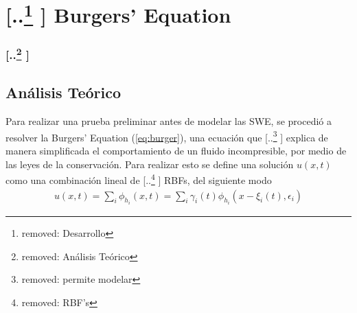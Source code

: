 \documentclass[spanish]{article} %
\providecommand{\DIFaddtex}[1]{{\protect\color{blue} \sf #1}} %
\providecommand{\DIFdeltex}[1]{{\protect\color{red} [..\footnote{removed: #1} ]}} %
\providecommand{\DIFaddbegin}{} %
\providecommand{\DIFaddend}{} %
\providecommand{\DIFdelbegin}{} %
\providecommand{\DIFdelend}{} %
\providecommand{\DIFadd}[1]{\texorpdfstring{\DIFaddtex{#1}}{#1}} %
\providecommand{\DIFdel}[1]{\texorpdfstring{\DIFdeltex{#1}}{}} %
\begin{document}
\section{\DIFdelbegin \DIFdel{Desarrollo}%
\DIFdelend Burgers' Equation}
  \DIFdelbegin \subsubsection{\DIFdel{Análisis Teórico}}
\addtocounter{subsubsection}{-1}%
\DIFdelend \DIFaddbegin \subsection{\DIFadd{Análisis Teórico}}
    \DIFaddend Para realizar una prueba preliminar antes de modelar las SWE, se procedió a resolver la Burgers' Equation (\ref{eq:burger}), una ecuación que \DIFdelbegin \DIFdel{permite modelar }\DIFdelend \DIFaddbegin \DIFadd{explica }\DIFaddend de manera simplificada el comportamiento de un fluido incompresible, por medio de las leyes de la conservación. Para realizar esto se define una solución $u(x,t)$ como una combinación lineal de \DIFdelbegin \DIFdel{RBF's}\DIFdelend \DIFaddbegin \DIFadd{RBFs}\DIFaddend , del siguiente modo
    \DIFdelbegin %
\DIFdelend \DIFaddbegin \begin{align}
      u(x,t) = \sum_{i} \phi_{h_i}(x,t) = \sum_i \gamma_i(t)\phi_{h_i}(x-\xi_i(t),\epsilon_i)
    \end{align}
    \DIFaddend 
\end{document}
